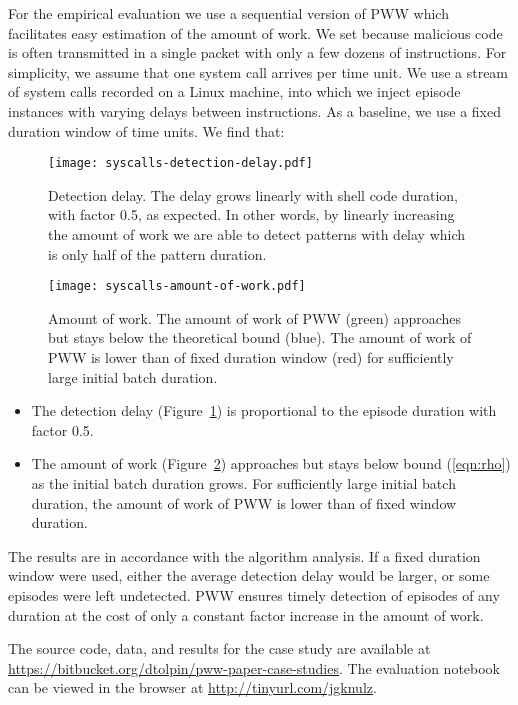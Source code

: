 \documentclass[runningheads,a4paper]{llncs}
\begin{document}
For the empirical evaluation we use a sequential version of PWW
which facilitates easy estimation of the amount of work. We set
 because malicious code is often transmitted in a
single packet with only a few dozens of instructions. For
simplicity, we assume that  one system call arrives per time
unit. We use a stream of  system calls recorded on a
Linux machine, into which we inject episode instances with
varying delays between instructions. As a baseline, we use a
fixed duration window of  time units. We find that:
\begin{figure}[t]
	\centering
    \texttt{[image: syscalls-detection-delay.pdf]}
	\caption{Detection delay. The delay grows linearly
    with shell code duration, with factor 0.5, as expected. In
    other words, by linearly increasing the amount of work we
    are able to detect patterns with delay which is only half of
    the pattern duration.}
    \label{fig:detection-delay}
\end{figure}
\begin{figure}[t]
	\centering
    \texttt{[image: syscalls-amount-of-work.pdf]}
    \caption{Amount of work. The amount of work of PWW (green)
    approaches but stays below the theoretical bound (blue).
    The amount of work of PWW is lower than of fixed duration window
    (red) for sufficiently large initial batch duration.}
    \label{fig:amount-of-work}
\end{figure}
\begin{itemize}
	\item The detection delay (Figure~\ref{fig:detection-delay})
		is proportional to the episode duration with factor 0.5.
	\item The amount of work (Figure~\ref{fig:amount-of-work})
        approaches but stays below bound (\ref{eqn:rho}) as the
        initial batch duration grows. For sufficiently large
        initial batch duration, the amount of work of PWW is
        lower than of fixed window duration.
\end{itemize}
The results are in accordance with the algorithm analysis.  If
a fixed duration window were used, either the average detection
delay would be larger, or some episodes were left undetected.
PWW ensures timely detection of episodes of any duration at the
cost of only a constant factor increase in the amount of work.

The source code, data, and results for the case study are available
at \url{https://bitbucket.org/dtolpin/pww-paper-case-studies}.
The evaluation notebook can be viewed in the browser at
\url{http://tinyurl.com/jgknulz}.
\end{document}

